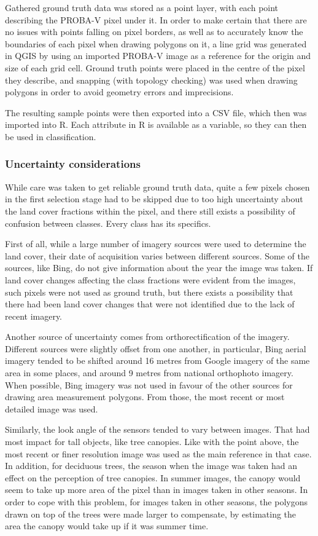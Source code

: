 \documentclass[a4paper,10pt]{book}
\begin{document}
Gathered ground truth data was stored as a point layer, with each point describing the PROBA-V pixel under it. In order to make certain that there are no issues with points falling on pixel borders, as well as to accurately know the boundaries of each pixel when drawing polygons on it, a line grid was generated in QGIS by using an imported PROBA-V image as a reference for the origin and size of each grid cell. Ground truth points were placed in the centre of the pixel they describe, and snapping (with topology checking) was used when drawing polygons in order to avoid geometry errors and imprecisions.

The resulting sample points were then exported into a CSV file, which then was imported into R. Each attribute in R is available as a variable, so they can then be used in classification.

\subsubsection{Uncertainty considerations}

While care was taken to get reliable ground truth data, quite a few pixels chosen in the first selection stage had to be skipped due to too high uncertainty about the land cover fractions within the pixel, and there still exists a possibility of confusion between classes. Every class has its specifics.

First of all, while a large number of imagery sources were used to determine the land cover, their date of acquisition varies between different sources. Some of the sources, like Bing, do not give information about the year the image was taken. If land cover changes affecting the class fractions were evident from the images, such pixels were not used as ground truth, but there exists a possibility that there had been land cover changes that were not identified due to the lack of recent imagery.

Another source of uncertainty comes from orthorectification of the imagery. Different sources were slightly offset from one another, in particular, Bing aerial imagery tended to be shifted around 16 metres from Google imagery of the same area in some places, and around 9 metres from national orthophoto imagery. When possible, Bing imagery was not used in favour of the other sources for drawing area measurement polygons. From those, the most recent or most detailed image was used.

Similarly, the look angle of the sensors tended to vary between images. That had most impact for tall objects, like tree canopies. Like with the point above, the most recent or finer resolution image was used as the main reference in that case. In addition, for deciduous trees, the season when the image was taken had an effect on the perception of tree canopies. In summer images, the canopy would seem to take up more area of the pixel than in images taken in other seasons. In order to cope with this problem, for images taken in other seasons, the polygons drawn on top of the trees were made larger to compensate, by estimating the area the canopy would take up if it was summer time.
\end{document}

